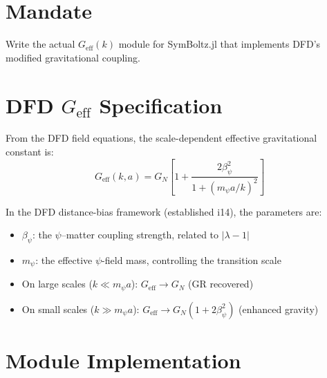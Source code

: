 \documentclass[11pt,a4paper]{article}
\begin{document}
\section{Mandate}

Write the actual $G_{\mathrm{eff}}(k)$ module for SymBoltz.jl that implements DFD's modified gravitational coupling.

\section{DFD $G_{\mathrm{eff}}$ Specification}

From the DFD field equations, the scale-dependent effective gravitational constant is:
\begin{equation}
G_{\mathrm{eff}}(k, a) = G_N \left[1 + \frac{2\beta_\psi^2}{1 + (m_\psi a / k)^2}\right]
\label{eq:Geff}
\end{equation}

In the DFD distance-bias framework (established i14), the parameters are:
\begin{itemize}
\item $\beta_\psi$: the $\psi$--matter coupling strength, related to $|\lambda - 1|$
\item $m_\psi$: the effective $\psi$-field mass, controlling the transition scale
\item On large scales ($k \ll m_\psi a$): $G_{\mathrm{eff}} \to G_N$ (GR recovered)
\item On small scales ($k \gg m_\psi a$): $G_{\mathrm{eff}} \to G_N(1 + 2\beta_\psi^2)$ (enhanced gravity)
\end{itemize}

\section{Module Implementation}
\end{document}
